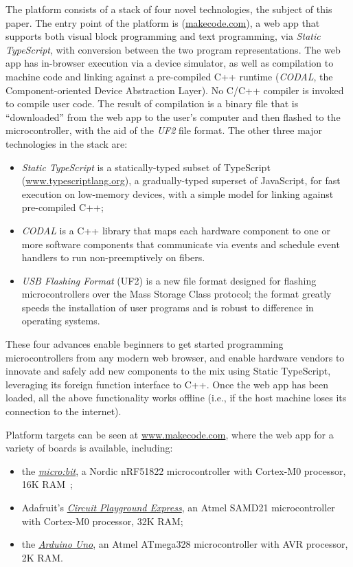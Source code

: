 The platform consists of a stack of four novel technologies, the subject of
this paper. The entry point of the platform is \emph{\MC} (\href{https://makecode.com}{makecode.com}),
a web app that supports both visual block programming and text programming,
via \emph{Static TypeScript}, with conversion 
between the two program representations. The web app has in-browser execution 
via a device simulator, as well as compilation to machine code and linking against a 
pre-compiled C++ runtime (\emph{CODAL}, the Component-oriented Device Abstraction Layer). No C/C++ compiler is invoked to compile user code. 
The result of compilation is a binary file that is ``downloaded'' from the web app to the user's 
computer and then flashed to the microcontroller, with the aid of the \emph{UF2} file format. The other three major technologies in the stack are:
\begin{itemize}

\item \emph{Static TypeScript} is a statically-typed subset of TypeScript (\url{www.typescriptlang.org}), 
a gradually-typed superset of JavaScript, for fast execution on low-memory devices, with
a simple model for linking against pre-compiled C++; 

\item \emph{CODAL} is a C++ library that maps 
each hardware component to one or more software components that communicate via events and
schedule event handlers to run non-preemptively on fibers. 

\item \emph{USB Flashing Format} (UF2) is a new file format designed for flashing microcontrollers over the Mass Storage
Class protocol; the format greatly speeds the installation of user 
programs and is robust to difference in operating systems. 
\end{itemize}
These four advances enable beginners to get started programming microcontrollers from any modern web browser, and enable
hardware vendors to innovate and safely add new components to the mix using Static TypeScript, leveraging its
foreign function interface to C++. 
Once the web app has been loaded, 
all the above functionality works offline (i.e., if the host machine loses its connection 
to the internet).

Platform targets can be seen at \url{www.makecode.com}, where the \MC web app for a variety of boards is available, 
including:
\begin{itemize}
\item the \emph{\href{https://microbit.org}{micro:bit}}, a Nordic nRF51822 microcontroller with Cortex-M0 processor, 16K RAM~\cite{microbitICSE2016};
\item Adafruit's \emph{\href{https:/adafruit.com/products/3333}{Circuit Playground Express}}, an Atmel SAMD21 microcontroller with Cortex-M0 processor, 32K RAM;
\item the \emph{\href{https://store.arduino.cc/usa/arduino-uno-rev3}{Arduino Uno}}, an Atmel ATmega328 microcontroller with AVR processor, 2K RAM.
\end{itemize}

